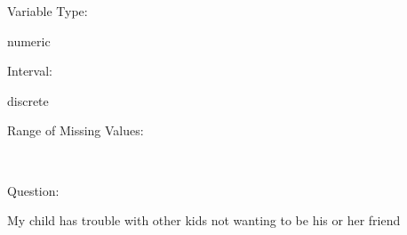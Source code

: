 \documentclass[
]{article}
\begin{document}
\begin{minipage}[t]{0.3\linewidth}

Variable Type:

\end{minipage}%
\begin{minipage}[t]{0.7\linewidth}

numeric

\end{minipage}

\begin{minipage}[t]{0.3\linewidth}

Interval:

\end{minipage}%
\begin{minipage}[t]{0.7\linewidth}

discrete

\end{minipage}

\begin{minipage}[t]{0.3\linewidth}

Range of Missing Values:

\end{minipage}%
\begin{minipage}[t]{0.7\linewidth}

~

\end{minipage}

\begin{minipage}[t]{0.3\linewidth}

Question:

\end{minipage}%
\begin{minipage}[t]{0.7\linewidth}

My child has trouble with other kids not wanting to be his or her friend

\end{minipage}
\end{document}
